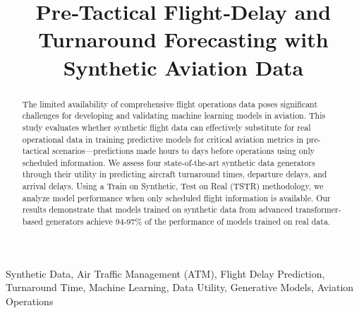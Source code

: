\documentclass[conference]{IEEEtran}
\begin{document}
\title{Pre‑Tactical Flight‑Delay and Turnaround Forecasting with Synthetic Aviation Data}



\author{
}


\maketitle



\begin{abstract}
    
    The limited availability of comprehensive flight operations data poses significant challenges for developing and validating machine learning models in aviation. This study evaluates whether synthetic flight data can effectively substitute for real operational data in training predictive models for critical aviation metrics in pre-tactical scenarios—predictions made hours to days before operations using only scheduled information. We assess four state-of-the-art synthetic data generators through their utility in predicting aircraft turnaround times, departure delays, and arrival delays. Using a Train on Synthetic, Test on Real (TSTR) methodology, we analyze model performance when only scheduled flight information is available. Our results demonstrate that models trained on synthetic data from advanced transformer-based generators achieve 94-97\% of the performance of models trained on real data. 

\end{abstract}

\begin{IEEEkeywords}
Synthetic Data, Air Traffic Management (ATM), Flight Delay Prediction, Turnaround Time, Machine Learning, Data Utility, Generative Models, Aviation Operations
\end{IEEEkeywords}
\end{document}
